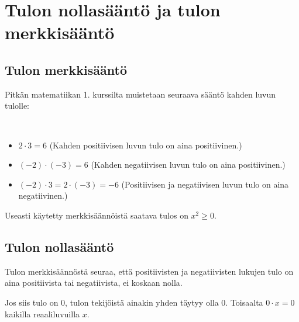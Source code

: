 \chapter{Tulon nollasääntö ja tulon merkkisääntö}

\section{Tulon merkkisääntö}

Pitkän matematiikan 1. kurssilta muistetaan seuraava sääntö kahden luvun tulolle:


\begin{esimerkki}{\ }
    \begin{itemize}
        \item $2\cdot 3 = 6$ (Kahden positiivisen luvun tulo on aina positiivinen.)
        \item $(-2)\cdot (-3) = 6$ (Kahden negatiivisen luvun tulo on aina positiivinen.)
        \item $(-2)\cdot 3 = 2\cdot (-3) = -6$ (Positiivisen ja negatiivisen luvun tulo on aina negatiivinen.)
    \end{itemize}
\end{esimerkki}

Useasti käytetty merkkisäännöistä saatava tulos on $x^2 \geq 0$.

\section{Tulon nollasääntö}

Tulon merkkisäännöstä seuraa, että positiivisten ja negatiivisten lukujen tulo on aina positiivista tai negatiivista, ei koskaan nolla.

Jos siis tulo on 0, tulon tekijöistä ainakin yhden täytyy olla 0. Toisaalta
$0\cdot x = 0$ kaikilla reaaliluvuilla $x$.

